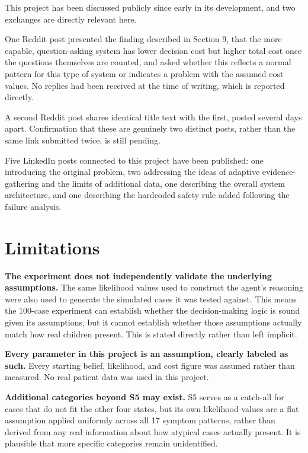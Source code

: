 \documentclass{article}
\begin{document}
This project has been discussed publicly since early in its development,
and two exchanges are directly relevant here.

One Reddit post presented the finding described in Section 9, that the
more capable, question-asking system has lower decision cost but higher
total cost once the questions themselves are counted, and asked whether
this reflects a normal pattern for this type of system or indicates a
problem with the assumed cost values. No replies had been received at
the time of writing, which is reported directly.

A second Reddit post shares identical title text with the first, posted
several days apart. Confirmation that these are genuinely two distinct
posts, rather than the same link submitted twice, is still pending.

Five LinkedIn posts connected to this project have been published: one
introducing the original problem, two addressing the ideas of adaptive
evidence-gathering and the limits of additional data, one describing the
overall system architecture, and one describing the hardcoded safety
rule added following the failure analysis.

\hypertarget{limitations}{%
\section{Limitations}\label{limitations}}

\textbf{The experiment does not independently validate the underlying
assumptions.} The same likelihood values used to construct the agent's
reasoning were also used to generate the simulated cases it was tested
against. This means the 100-case experiment can establish whether the
decision-making logic is sound given its assumptions, but it cannot
establish whether those assumptions actually match how real children
present. This is stated directly rather than left implicit.

\textbf{Every parameter in this project is an assumption, clearly
labeled as such.} Every starting belief, likelihood, and cost figure was
assumed rather than measured. No real patient data was used in this
project.

\textbf{Additional categories beyond S5 may exist.} S5 serves as a
catch-all for cases that do not fit the other four states, but its own
likelihood values are a flat assumption applied uniformly across all 17
symptom patterns, rather than derived from any real information about
how atypical cases actually present. It is plausible that more specific
categories remain unidentified.
\end{document}
